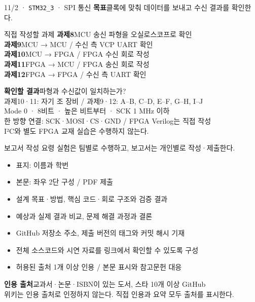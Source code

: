 \documentclass[aspectratio=43,11pt,t]{beamer}
\newcommand{\lab}[1]{\texttt{STM32\_#1}}
\begin{document}
\begin{frame}{11/2 · \lab{3} · SPI 통신}
\fontsize{10}{13}\selectfont
\textbf{목표}\quad 클록에 맞춰 데이터를 보내고 수신 결과를 확인한다.
\vspace{0.15cm}
\begin{block}{직접 작성할 과제}
\fontsize{9}{12}\selectfont
\textbf{과제8}\quad MCU 송신 파형을 오실로스코프로 확인\\[0.07cm]
\textbf{과제9}\quad MCU → MCU / 수신 측 VCP UART 확인\\[0.07cm]
\textbf{과제10}\quad MCU → FPGA / FPGA 수신 회로 작성\\[0.07cm]
\textbf{과제11}\quad FPGA → MCU / FPGA 송신 회로 작성\\[0.07cm]
\textbf{과제12}\quad FPGA → FPGA / 수신 측 UART 확인
\end{block}
\vspace{0.1cm}
\fontsize{9}{12}\selectfont
\textbf{확인할 결과}\quad 파형과 수신값이 일치하는가?\\[0.1cm]
과제10·11: 자기 조 장비 / 과제9·12: A--B, C--D, E--F, G--H, I--J\\
Mode 0 · 8비트 · 높은 비트부터 · SCK 1 MHz 이하\\
한 방향 연결: SCK·MOSI·CS·GND / FPGA Verilog는 직접 작성\\
I²C와 별도 FPGA 교재 실습은 수행하지 않는다.
\end{frame}
\begin{frame}{보고서 작성 요령}
\fontsize{10}{13}\selectfont
실험은 팀별로 수행하고, 보고서는 개인별로 작성·제출한다.
\vspace{0.15cm}
\begin{itemize}\setlength{\itemsep}{0.12cm}
\item 표지: 이름과 학번
\item 본문: 좌우 2단 구성 / PDF 제출
\item 설계 목표·방법, 핵심 코드·회로 구조와 검증 결과
\item 예상과 실제 결과 비교, 문제 해결 과정과 결론
\item GitHub 저장소 주소, 제출 버전의 태그와 커밋 해시 기재
\item 전체 소스코드와 시연 자료를 링크에서 확인할 수 있도록 구성
\item 허용된 출처 1개 이상 인용 / 본문 표시와 참고문헌 대응
\end{itemize}
\vspace{0.1cm}
\fontsize{8}{10}\selectfont
\textbf{인용 출처}\quad 교과서·논문·ISBN이 있는 도서, 스타 10개 이상 GitHub\\
위키는 인용 출처로 인정하지 않는다. 직접 인용과 요약 모두 출처를 표시한다.
\end{frame}
\end{document}
